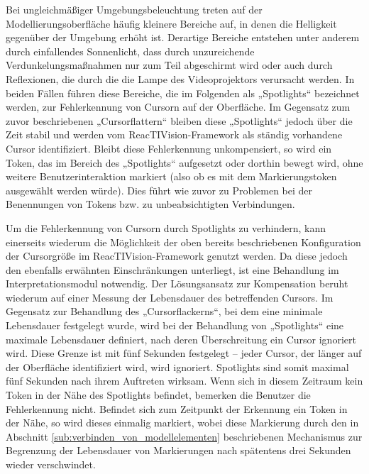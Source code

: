 Bei ungleichmäßiger Umgebungsbeleuchtung treten auf der Modellierungsoberfläche häufig kleinere Bereiche auf, in denen die Helligkeit gegenüber der Umgebung erhöht ist. Derartige Bereiche entstehen unter anderem durch einfallendes Sonnenlicht, dass durch unzureichende Verdunkelungsmaßnahmen nur zum Teil abgeschirmt wird oder auch durch Reflexionen, die durch die die Lampe des Videoprojektors verursacht werden. In beiden Fällen führen diese Bereiche, die im Folgenden als „Spotlights“ bezeichnet werden, zur Fehlerkennung von Cursorn auf der Oberfläche. Im Gegensatz zum zuvor beschriebenen „Cursorflattern“ bleiben diese „Spotlights“ jedoch über die Zeit stabil und werden vom ReacTIVision-Framework als ständig vorhandene Cursor identifiziert. Bleibt diese Fehlerkennung unkompensiert, so wird ein Token, das im Bereich des „Spotlights“ aufgesetzt oder dorthin bewegt wird, ohne weitere Benutzerinteraktion markiert (also ob es mit dem Markierungstoken ausgewählt werden würde). Dies führt wie zuvor zu Problemen bei der Benennungen von Tokens bzw. zu unbeabsichtigten Verbindungen. 

Um die Fehlerkennung von Cursorn durch Spotlights zu verhindern, kann einerseits wiederum die Möglichkeit der oben bereits beschriebenen Konfiguration der Cursorgröße im ReacTIVision-Framework genutzt werden. Da diese jedoch den ebenfalls erwähnten Einschränkungen unterliegt, ist eine Behandlung im Interpretationsmodul notwendig. Der Lösungsansatz zur Kompensation beruht wiederum auf einer Messung der Lebensdauer des betreffenden Cursors. Im Gegensatz zur Behandlung des „Cursorflackerns“, bei dem eine minimale Lebensdauer festgelegt wurde, wird bei der Behandlung von „Spotlights“ eine maximale Lebensdauer definiert, nach deren Überschreitung ein Cursor ignoriert wird. Diese Grenze ist mit fünf Sekunden festgelegt -- jeder Cursor, der länger auf der Oberfläche identifiziert wird, wird ignoriert. Spotlights sind somit maximal fünf Sekunden nach ihrem Auftreten wirksam. Wenn sich in diesem Zeitraum kein Token in der Nähe des Spotlights befindet, bemerken die Benutzer die Fehlerkennung nicht. Befindet sich zum Zeitpunkt der Erkennung ein Token in der Nähe, so wird dieses einmalig markiert, wobei diese Markierung durch den in Abschnitt \ref{sub:verbinden_von_modellelementen} beschriebenen Mechanismus zur Begrenzung der Lebensdauer von Markierungen nach spätentens drei Sekunden wieder verschwindet.

